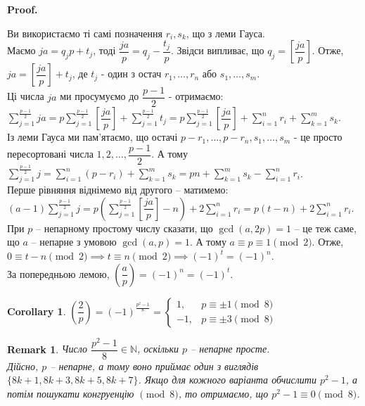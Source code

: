 \documentclass[a4paper, 14pt]{extarticle}
\makeatletter
\theoremstyle{theoremdd}
\theoremstyle{theoremdd}
\theoremstyle{theoremdd}
\theoremstyle{theoremdd}
\theoremstyle{theoremdd}
\theoremstyle{theoremdd}
\newtheorem{remark}[theorem]{Remark}
\theoremstyle{theoremdd}
\theoremstyle{theoremdd}
\newtheorem{corollary}[theorem]{Corollary}
\def\qed{$\blacksquare$}
\renewenvironment{proof}[1][Proof.\\]{\par
\pushQED{\hfill \qed}%
\normalfont \topsep6\p@\@plus6\p@\relax
\trivlist
\item\relax
{\bfseries
#1\@addpunct{.}}\hspace\labelsep\ignorespaces
}{%
\popQED\endtrivlist\@endpefalse
}
\makeatother
\begin{document}
\begin{proof}
Ви використаємо ті самі позначення $r_i,s_k$, що з леми Гауса.\\
Маємо $ja = q_j p + t_j$, тоді $\dfrac{ja}{p} = q_j - \dfrac{t_j}{p}$. Звідси випливає, що $q_j = \left[ \dfrac{ja}{p} \right]$. Отже, $ja = \left[ \dfrac{ja}{p} \right] + t_j$, де $t_j$ - один з остач $r_1,\dots,r_n$ або $s_1,\dots,s_m$.\\
Ці числа $ja$ ми просумуємо до $\dfrac{p-1}{2}$ - отримаємо:\\
$\displaystyle\sum_{j=1}^{\frac{p-1}{2}} ja = p\sum_{j=1}^{\frac{p-1}{2}} \left[ \dfrac{ja}{p} \right] + \sum_{j=1}^{\frac{p-1}{2}}t_j = p\sum_{j=1}^{\frac{p-1}{2}} \left[ \dfrac{ja}{p} \right] + \sum_{i=1}^n r_i + \sum_{k=1}^m s_k$.\\
Із леми Гауса ми пам'ятаємо, що остачі $p-r_1,\dots,p-r_n, s_1,\dots,s_m$ - це просто пересортовані числа $1,2,\dots,\dfrac{p-1}{2}$. А тому\\
$\displaystyle\sum_{j=1}^{\frac{p-1}{2}} j = \sum_{i=1}^n (p-r_i) + \sum_{k=1}^m s_k = pn + \sum_{k=1}^m s_k - \sum_{i=1}^n r_i$.\\
Перше рівняння віднімемо від другого -- матимемо:\\
$\displaystyle (a-1)\sum_{j=1}^{\frac{p-1}{2}}j = p \left( \sum_{j=1}^{\frac{p-1}{2}} \left[ \dfrac{ja}{p} \right] - n \right) + 2 \sum_{i=1}^n r_i = p(t-n)+2 \sum_{i=1}^n r_i$.\\
При $p$ -- непарному простому числу сказати, що $\gcd(a,2p) = 1$ -- це теж саме, що $a$ -- непарне з умовою $\gcd(a,p) = 1$. А тому $a \equiv p \equiv 1 \pmod 2$. Отже,\\
$0 \equiv t-n \pmod 2 \implies t \equiv n \pmod 2 \implies (-1)^t = (-1)^n$.\\
За попередньою лемою, $\left( \dfrac{a}{p} \right) = (-1)^n = (-1)^t$.
\end{proof}

\begin{corollary}
$\left( \dfrac{2}{p} \right) = (-1)^{\textstyle\frac{p^2-1}{8}} = \begin{cases} 1, & p \equiv \pm 1 \pmod 8 \\ -1, & p \equiv \pm 3 \pmod 8 \end{cases}$
\end{corollary}

\begin{remark}
Число $\dfrac{p^2-1}{8} \in \mathbb{N}$, оскільки $p$ -- непарне просте.\\ Дійсно, $p$ -- непарне, а тому воно приймає один з виглядів $\{8k+1,8k+3,8k+5,8k+7\}$. Якщо для кожного варіанта обчислити $p^2-1$, а потім пошукати конгруенцію $\pmod 8$, то отримаємо, що $p^2-1 \equiv 0 \pmod 8$.
\end{remark}
\end{document}
